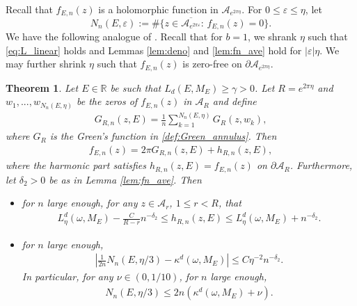 \documentclass[11pt]{amsart}
\newtheorem{theorem}{Theorem}[section]
\newcommand{\R}{\mathbb R}
\begin{document}
Recall that $f_{E,n}(z)$ is a holomorphic function in $\mathcal{A}_{e^{2\pi \eta}}$. 
For $0\leq \varepsilon\leq \eta$, let $$N_n(E,\varepsilon):=\#\{z\in \overline{\mathcal{A}_{e^{2\pi \varepsilon}}}:\, f_{E,n}(z)=0\}.$$
We have the following analogue of \cite[Theorem 4.4]{HS2}. 
Recall that for $b=1$, we shrank $\eta$ such that \eqref{eq:L_linear} holds and Lemmas \ref{lem:deno} and \ref{lem:fn_ave} hold for $|\varepsilon|\eta$. We may further shrink $\eta$ such that $f_{E,n}(z)$ is zero-free on $\partial \mathcal{A}_{e^{2\pi\eta}}$.
\begin{theorem}\label{thm:Riesz_un}
Let $E\in \R$ be such that $L_d(E,M_E)\geq \gamma>0$. 
Let $R=e^{2\pi\eta}$ and $w_1,...,w_{N_n(E,\eta)}$ be the zeros of $f_{E,n}(z)$ in $\mathcal{A}_{R}$
and  define 
\begin{align*}
G_{R,n}(z,E)=\frac{1}{n}\sum_{k=1}^{N_n(E,\eta)} G_R(z, w_k),
\end{align*}
where $G_R$ is the Green's function in \eqref{def:Green_annulus}. Then 
\begin{align}\label{eq:f=G+h}
f_{E,n}(z)=2\pi G_{R,n}(z,E)+h_{R,n}(z,E),
\end{align}
where the harmonic part satisfies $h_{R,n}(z,E)=f_{E,n}(z)$ on $\partial \mathcal{A}_R$.
Furthermore, let $\delta_2>0$ be as in Lemma \ref{lem:fn_ave}. Then 
\begin{itemize}
\item for $n$ large enough, for any $z\in \mathcal{A}_{r}$, $1\leq r<R$, that
\begin{align}\label{eq:h_constant_un}
L^d_{\eta}(\omega,M_E)-\frac{C}{R-r} n^{-\delta_2} \leq  h_{R,n}(z,E)\leq L^d_{\eta}(\omega,M_E)+n^{-\delta_2}.
\end{align}
\item for $n$ large enough,
\begin{align}\label{eq:N_est_un}
|\frac{1}{2n} N_n(E, \eta/3)-\kappa^d(\omega,M_E)|\leq C\eta^{-2} n^{-\delta_2}.
\end{align}
In particular, for any $\nu\in (0,1/10)$, for $n$ large enough,
\begin{align}\label{eq:N_est_un_kappa=d}
N_n(E, \eta/3)\leq 2n(\kappa^d(\omega,M_E)+\nu).
\end{align}
\end{itemize}
\end{theorem}
\end{document}

